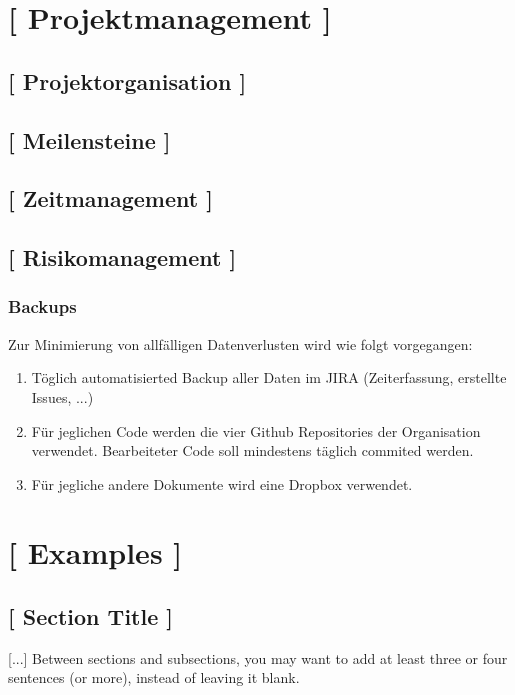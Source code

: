 \documentclass[11pt,a4paper,english,oneside]{book}
\numberwithin{equation}{chapter}
\begin{document}
\chapter{ [ Projektmanagement ]}

\section{ [ Projektorganisation ] }

\section{ [ Meilensteine ] }

\section{ [ Zeitmanagement ] }

\section{ [ Risikomanagement ] }
\subsection{Backups}
Zur Minimierung von allfälligen Datenverlusten wird wie folgt vorgegangen:

\begin{enumerate}
	\item Töglich automatisierted Backup aller Daten im JIRA \cite{jira} (Zeiterfassung, erstellte Issues, ...)
	\item Für jeglichen Code werden die vier Github Repositories der Organisation \cite{github} verwendet. Bearbeiteter Code soll mindestens täglich commited werden.
	\item Für jegliche andere Dokumente wird eine Dropbox \cite{dropbox} verwendet.
\end{enumerate}

\chapter{ [ Examples ]}

\section{[ Section Title ]}

[...] Between sections and subsections, you may want to add at least three or four sentences (or more), instead of leaving it blank.
\end{document}
